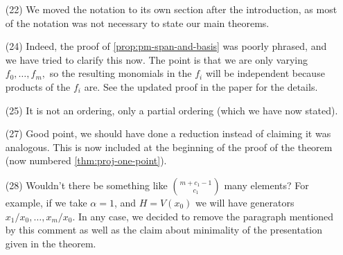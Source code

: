\documentclass[10 pt]{amsart}
\theoremstyle{plain}
\theoremstyle{definition}
\theoremstyle{remark}
\numberwithin{equation}{section}
\begin{document}
\begin{enumerate}
	\item[(22)]
		We moved the notation to its own section after the introduction,
		as most of the notation was not necessary to state
		our main theorems.
	
	\item[(24)]
		Indeed, the proof of \autoref{prop:pm-span-and-basis}	was poorly
		phrased, and we have tried to clarify this now.
		The point is that we are only varying $f_0, \ldots, f_m,$ so
		the resulting monomials in the $f_i$ will be independent because
		products of the $f_i$ are. See the updated proof in the paper for the details.
	
	\item[(25)]
		It is not an ordering, only a partial ordering (which we have now stated).
		
	\item[(27)]
		Good point, we should have done a reduction instead of claiming it was analogous.
		This is now included at the beginning of the proof of the theorem
		(now numbered \autoref{thm:proj-one-point}).
		
	\item[(28)]
		Wouldn't there be something like $\binom{m + c_1- 1}{c_1}$ many
		elements? For example, if	we take $\alpha = 1$, and $H = V(x_0)$
		we will have generators $x_1/x_0, \ldots, x_m/x_0$.
		In any case, we decided to remove the paragraph mentioned by
		this comment as well as the claim about minimality of the
		presentation given in the theorem.
\end{enumerate}
\end{document}
